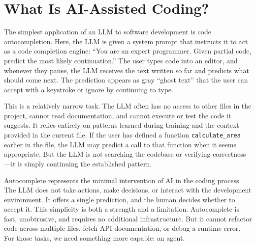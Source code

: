 \section{What Is AI-Assisted Coding?}\label{sec:autocomplete}

The simplest application of an LLM to software development is code autocompletion. Here, the LLM is given a system prompt that instructs it to act as a code completion engine: ``You are an expert programmer. Given partial code, predict the most likely continuation.'' The user types code into an editor, and whenever they pause, the LLM receives the text written so far and predicts what should come next. The prediction appears as gray ``ghost text'' that the user can accept with a keystroke or ignore by continuing to type.

This is a relatively narrow task. The LLM often has no access to other files in the project, cannot read documentation, and cannot execute or test the code it suggests. It relies entirely on patterns learned during training and the context provided in the current file. If the user has defined a function \texttt{calculate\_area} earlier in the file, the LLM may predict a call to that function when it seems appropriate. But the LLM is not searching the codebase or verifying correctness---it is simply continuing the established pattern.

Autocomplete represents the minimal intervention of AI in the coding process. The LLM does not take actions, make decisions, or interact with the development environment. It offers a single prediction, and the human decides whether to accept it. This simplicity is both a strength and a limitation. Autocomplete is fast, unobtrusive, and requires no additional infrastructure. But it cannot refactor code across multiple files, fetch API documentation, or debug a runtime error. For those tasks, we need something more capable: an agent.

